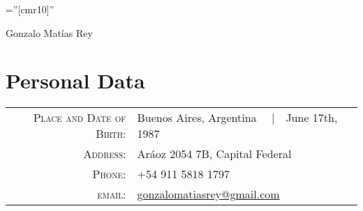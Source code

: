 \documentclass[a4paper,10pt]{article}
\begin{document}

\pagestyle{empty} %

\font\fb=''[cmr10]'' %

\par{\centering
		{\Huge Gonzalo Matías Rey
	}\bigskip\par}

\section{Personal Data}

\begin{tabular}{rl}
    \textsc{Place and Date of Birth:} & Buenos Aires, Argentina \ \ |\ \ June 17th, 1987 \\
    \textsc{Address:}   & Aráoz 2054 7B, Capital Federal \\
    \textsc{Phone:}     & +54 911 5818 1797\\
    \textsc{email:}     & \href{mailto:gonzalomatiasrey@gmail.com}{gonzalomatiasrey@gmail.com}
\end{tabular}

\end{document}
